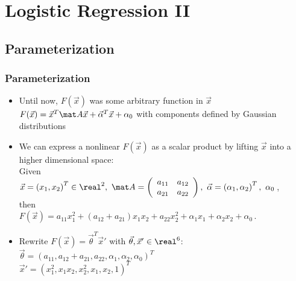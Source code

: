 \section{Logistic Regression II}

\subsection{Parameterization}

\begin{frame}
  \frametitle{Parameterization}
  
  \begin{itemize}
    \item Until now, $F(\vec x)$ was some arbitrary function in $\vec x$ \\[.1cm]
       $ F(\vec x) = \vec x^T \mat A \vec x + \vec \alpha^T\vec x + \alpha_0 $ with components defined by Gaussian distributions \\[.25cm] \pause
    \item We can express a nonlinear $F(\vec x)$ as a scalar product by lifting $\vec x$ into a higher dimensional space: \\
      Given \\
      \hspace{0.5cm} $\vec x = \left(x_1, x_2\right)^T \in \real^2,~ \mat A = \left( \begin{array}{cc} a_{11} & a_{12} \\ a_{21} & a_{22} \end{array} \right), ~ \vec \alpha = \left(\alpha_1, \alpha_2 \right)^T, ~\alpha_0 $\,, \\
      then \\
      \hspace{0.5cm} $F(\vec x) = a_{11} x_1^2 + (a_{12} + a_{21}) x_1 x_2 + a_{22} x_2^2 + \alpha_1 x_1 + \alpha_2 x_2 + \alpha_0$\,.\\[.25cm] \pause
    \item Rewrite $F(\vec x) = \vec \theta^T \vec x'$ with $\vec \theta, \vec x' \in \real^6$: \\ \pause
      \hspace{0.5cm} $\vec \theta = (a_{11}, a_{12} + a_{21}, a_{22}, \alpha_1, \alpha_2, \alpha_0)^T$ \\
      \hspace{0.5cm} $\vec x' = ( x_1^2, x_1 x_2, x_2^2, x_1, x_2, 1)^T$
  \end{itemize}
\end{frame}


